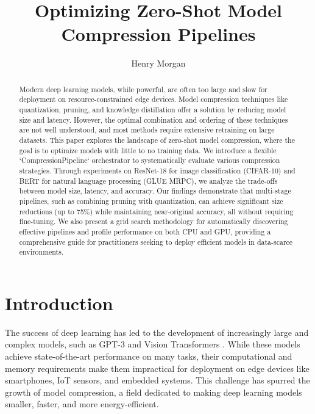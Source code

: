 \documentclass[sigconf]{acmart}
\begin{document}
\title{Optimizing Zero-Shot Model Compression Pipelines}

\author{Henry Morgan}


\begin{abstract}
Modern deep learning models, while powerful, are often too large and slow for deployment on resource-constrained edge devices. Model compression techniques like quantization, pruning, and knowledge distillation offer a solution by reducing model size and latency. However, the optimal combination and ordering of these techniques are not well understood, and most methods require extensive retraining on large datasets. This paper explores the landscape of zero-shot model compression, where the goal is to optimize models with little to no training data. We introduce a flexible `CompressionPipeline` orchestrator to systematically evaluate various compression strategies. Through experiments on ResNet-18 for image classification (CIFAR-10) and BERT for natural language processing (GLUE MRPC), we analyze the trade-offs between model size, latency, and accuracy. Our findings demonstrate that multi-stage pipelines, such as combining pruning with quantization, can achieve significant size reductions (up to 75\%) while maintaining near-original accuracy, all without requiring fine-tuning. We also present a grid search methodology for automatically discovering effective pipelines and profile performance on both CPU and GPU, providing a comprehensive guide for practitioners seeking to deploy efficient models in data-scarce environments.
\end{abstract}


\maketitle

\section{Introduction}
The success of deep learning has led to the development of increasingly large and complex models, such as GPT-3 \cite{dantas2024comprehensive} and Vision Transformers \cite{peng2020cream}. While these models achieve state-of-the-art performance on many tasks, their computational and memory requirements make them impractical for deployment on edge devices like smartphones, IoT sensors, and embedded systems. This challenge has spurred the growth of model compression, a field dedicated to making deep learning models smaller, faster, and more energy-efficient.
\end{document}
